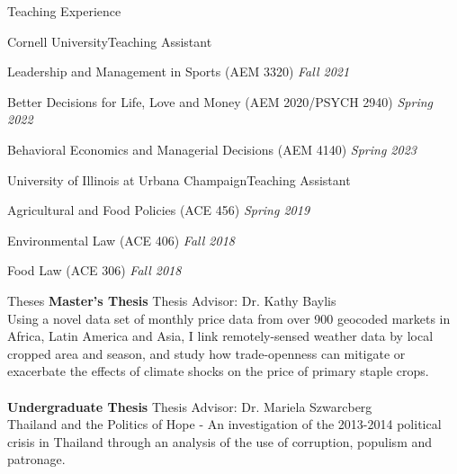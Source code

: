 \documentclass{resume} %
\begin{document}
\newpage
\begin{rSection}{Teaching Experience} 
\begin{rSubsection}{Cornell University}{}{Teaching Assistant}{}
\item Leadership and Management in Sports (AEM 3320) \hfill \textit{Fall 2021}
\item Better Decisions for Life, Love and Money (AEM 2020/PSYCH 2940) \hfill \textit{Spring 2022}
\item Behavioral Economics and Managerial Decisions (AEM 4140) \hfill \textit{Spring 2023}
\end{rSubsection}

\begin{rSubsection}{University of Illinois at Urbana Champaign}{}{Teaching Assistant}{}
\item Agricultural and Food Policies (ACE 456) \hfill \textit{Spring 2019}
\item Environmental Law (ACE 406) \hfill \textit{Fall 2018}
\item Food Law (ACE 306) \hfill \textit{Fall 2018}
\end{rSubsection}
\end{rSection}
\begin{rSection}{Theses}
{\bf Master's Thesis } 
{Thesis Advisor: Dr. Kathy Baylis}
\\Using a novel data set of monthly price data from over 900 geocoded markets in Africa, Latin America and Asia, I link remotely-sensed weather data by local cropped area and season, and study how trade-openness can mitigate or exacerbate the effects of climate shocks on the price of primary staple crops. \\
\\ {\bf Undergraduate Thesis } {Thesis Advisor: Dr. Mariela Szwarcberg}\\
Thailand and the Politics of Hope - An investigation of the 2013-2014 political crisis in Thailand through an analysis of the use of corruption, populism and patronage.

\end{rSection}
\end{document}
